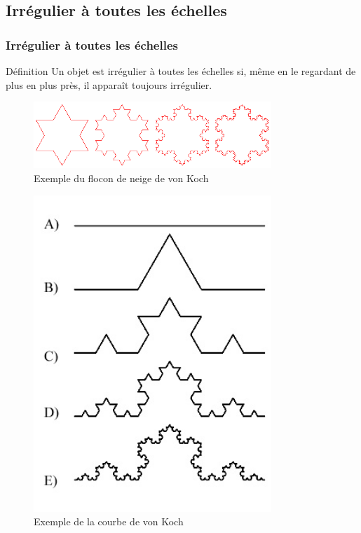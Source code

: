 \documentclass[aspectratio=1610]{beamer}
\begin{document}
\subsection{Irrégulier à toutes les échelles}
\begin{frame}
\frametitle{Irrégulier à toutes les échelles}

\begin{minipage}{0.6\textwidth}
\begin{block}{Définition}
    Un objet est irrégulier à toutes les échelles si, même en le regardant de plus en plus près, il apparaît toujours irrégulier.
\end{block}
\begin{figure}[h]
    \centering
    \includegraphics[width=0.8\textwidth]{flocon}
    {\caption*{Exemple du flocon de neige de von Koch}}
    \label{fig:flocon}
\end{figure}
\end{minipage}%
\begin{minipage}{0.4\textwidth}
    \begin{figure}[h]
        \centering
        \includegraphics[width=0.8\textwidth]{courbe_de_von_koch}
        {\caption*{Exemple de la courbe de von Koch}}
        \label{fig:courbe_de_von_koch}
    \end{figure}
\end{minipage}
\end{frame}
\end{document}

